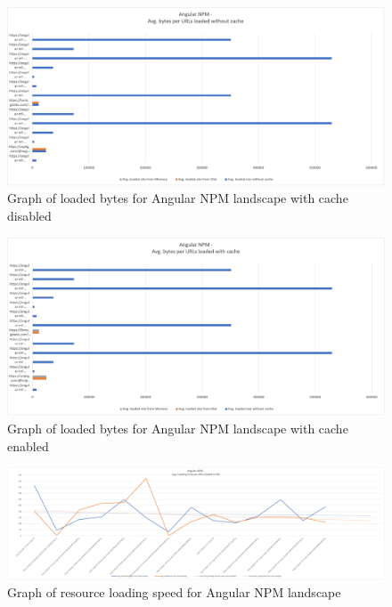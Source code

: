 \newpage
\begin{figure}[!h]
	\centering
	\includegraphics[width=1.4\textwidth, angle=90]{Figures/angular_npm_bytes.png}
	\caption{Graph of loaded bytes for Angular NPM landscape with cache disabled}
	\label{fig:appendix_1_3}
\end{figure}
\newpage
\begin{figure}[!h]
	\centering
	\includegraphics[width=1.4\textwidth, angle=90]{Figures/angular_npm_bytes_cache.png}
	\caption{Graph of loaded bytes for Angular NPM landscape with cache enabled}
	\label{fig:appendix_1_4}
\end{figure}
\newpage
\begin{figure}[!h]
	\centering
	\includegraphics[width=1.4\textwidth, angle=90]{Figures/angular_npm_speed.png}
	\caption{Graph of resource loading speed for Angular NPM landscape}
	\label{fig:appendix_1_5}
\end{figure}
\newpage

